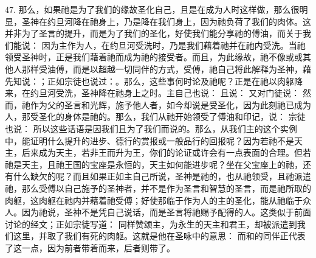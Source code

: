 47. 那么，如果祂是为了我们的缘故圣化自己，且是在成为人时这样做，那么很明显，圣神在约旦河降在祂身上，乃是降在我们身上，因为祂负荷了我们的肉体。这并非为了圣言的提升，而是为了我们的圣化，好使我们能分享祂的傅油，而关于我们能说： 因为主作为人，在约旦河受洗时，乃是我们藉着祂并在祂内受洗。当祂领受圣神时，正是我们藉着祂而成为祂的接受者。而且，为此缘故，祂不像或或其他人那样受油傅，而是以超越一切同伴的方式，受傅，祂自己将此解释为圣神，藉先知说：；正如宗徒也说过：。那么，这些事何时论及祂呢？正是在祂以肉躯降来，在约旦河受洗，圣神降在祂身上之时。主自己也说： 且说： 又对门徒说： 然而，祂作为父的圣言和光辉，施予他人者，如今却说是受圣化，因为此刻祂已成为人，那受圣化的身体是祂的。那么，我们从祂开始领受了傅油和印记，说： 宗徒也说： 所以这些话语是因我们且为了我们而说的。那么，从我们主的这个实例中，能证明什么提升的进步、德行的赏报或一般品行的回报呢？因为若祂不是天主，后来成为天主，若非王而升为王，你们的论证或许会有一点表面的合理。但若祂是天主，且祂王国的宝座是永恒的，天主如何能进步呢？坐在父宝座上的祂，还有什么缺欠的呢？而且如果正如主自己所说，圣神是祂的，也从祂领受，且祂派遣祂，那么受傅以自己施予的圣神者，并不是作为圣言和智慧的圣言，而是祂所取的肉躯，这肉躯在祂内并藉着祂受傅；好使那临于作为人的主的圣化，能从祂临于众人。因为祂说，圣神不是凭自己说话，而是圣言将祂赐予配得的人。这类似于前面讨论的经文；正如宗徒写道： 同样赞颂主，为永生的天主和君王，却被派遣到我们这里，并取了我们有死的肉躯。这就是他在圣咏中的意思： 而和的同伴正代表了这一点，因为前者带着而来，后者则带了。\par

